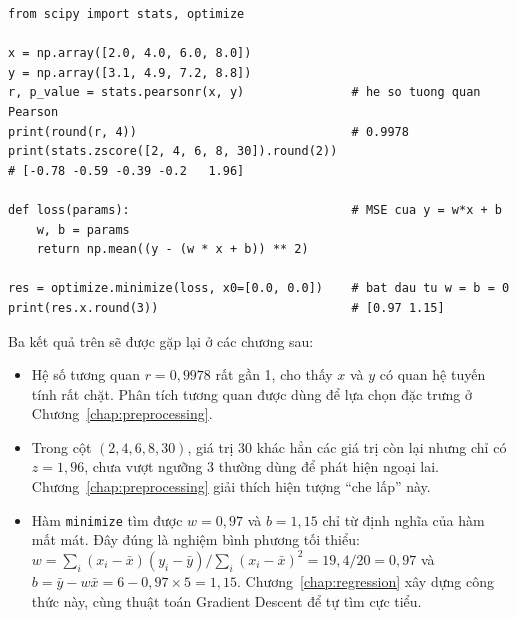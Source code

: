 \begin{lstlisting}[caption={Tương quan, z-score và cực tiểu hóa hàm mất mát với SciPy}]
from scipy import stats, optimize

x = np.array([2.0, 4.0, 6.0, 8.0])
y = np.array([3.1, 4.9, 7.2, 8.8])
r, p_value = stats.pearsonr(x, y)               # he so tuong quan Pearson
print(round(r, 4))                              # 0.9978
print(stats.zscore([2, 4, 6, 8, 30]).round(2))
# [-0.78 -0.59 -0.39 -0.2   1.96]

def loss(params):                               # MSE cua y = w*x + b
    w, b = params
    return np.mean((y - (w * x + b)) ** 2)

res = optimize.minimize(loss, x0=[0.0, 0.0])    # bat dau tu w = b = 0
print(res.x.round(3))                           # [0.97 1.15]
\end{lstlisting}

Ba kết quả trên sẽ được gặp lại ở các chương sau:
\begin{itemize}
    \item Hệ số tương quan $r = 0{,}9978$ rất gần 1, cho thấy $x$ và $y$ có quan hệ tuyến tính rất chặt. Phân tích tương quan được dùng để lựa chọn đặc trưng ở Chương~\ref{chap:preprocessing}.
    \item Trong cột $(2, 4, 6, 8, 30)$, giá trị 30 khác hẳn các giá trị còn lại nhưng chỉ có $z = 1{,}96$, chưa vượt ngưỡng 3 thường dùng để phát hiện ngoại lai. Chương~\ref{chap:preprocessing} giải thích hiện tượng ``che lấp'' này.
    \item Hàm \texttt{minimize} tìm được $w = 0{,}97$ và $b = 1{,}15$ chỉ từ định nghĩa của hàm mất mát. Đây đúng là nghiệm bình phương tối thiểu: $w = \sum_i (x_i - \bar{x})(y_i - \bar{y}) / \sum_i (x_i - \bar{x})^2 = 19{,}4/20 = 0{,}97$ và $b = \bar{y} - w\bar{x} = 6 - 0{,}97 \times 5 = 1{,}15$. Chương~\ref{chap:regression} xây dựng công thức này, cùng thuật toán Gradient Descent để tự tìm cực tiểu.
\end{itemize}

